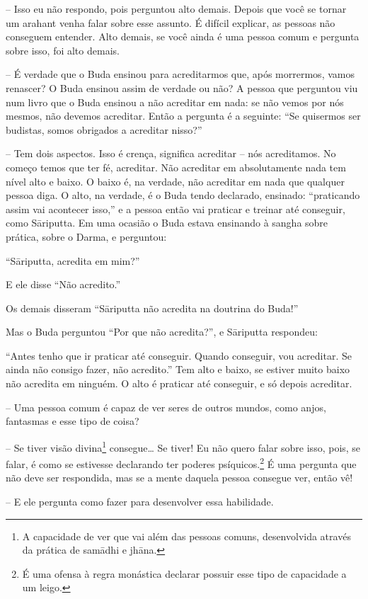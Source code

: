 -- Isso eu não respondo, pois perguntou alto demais. Depois que
você se tornar um arahant venha falar sobre esse assunto. É difícil
explicar, as pessoas não conseguem entender. Alto demais, se você ainda
é uma pessoa comum e pergunta sobre isso, foi alto demais.

-- É verdade que o Buda ensinou para acreditarmos que, após
morrermos, vamos renascer? O Buda ensinou assim de verdade ou não? A
pessoa que perguntou viu num livro que o Buda ensinou a não acreditar
em nada: se não vemos por nós mesmos, não devemos acreditar. Então a
pergunta é a seguinte: “Se quisermos ser budistas, somos obrigados a
acreditar nisso?”

-- Tem dois aspectos. Isso é crença, significa acreditar – nós
acreditamos. No começo temos que ter fé, acreditar. Não acreditar em
absolutamente nada tem nível alto e baixo. O baixo é, na verdade, não
acreditar em nada que qualquer pessoa diga. O alto, na verdade, é o
Buda tendo declarado, ensinado: “praticando assim vai acontecer isso,”
e a pessoa então vai praticar e treinar até conseguir, como
Sāriputta. Em uma ocasião o Buda estava ensinando à sangha sobre
prática, sobre o Darma, e perguntou:

“Sāriputta, acredita em mim?” 

E ele disse “Não acredito.” 

Os demais disseram “Sāriputta não acredita na doutrina do Buda!”

Mas o Buda perguntou “Por que não acredita?”, e Sāriputta
respondeu:

“Antes tenho que ir praticar até conseguir. Quando conseguir, vou
acreditar. Se ainda não consigo fazer, não acredito.” Tem alto e baixo,
se estiver muito baixo não acredita em ninguém. O alto é praticar até
conseguir, e só depois acreditar.

-- Uma pessoa comum é capaz de ver seres de outros mundos, como
anjos, fantasmas e esse tipo de coisa?

-- Se tiver visão divina\footnote{A capacidade de ver que vai além
das pessoas comuns, desenvolvida através da prática de samādhi e
jhāna.} consegue\ldots{} Se tiver! Eu não quero falar sobre isso, pois, se
falar, é como se estivesse declarando ter poderes psíquicos.\footnote{É
uma ofensa à regra monástica declarar possuir esse tipo de capacidade a
um leigo.} É uma pergunta que não deve ser respondida, mas se a mente
daquela pessoa consegue ver, então vê!

-- E ele pergunta como fazer para desenvolver essa habilidade.

